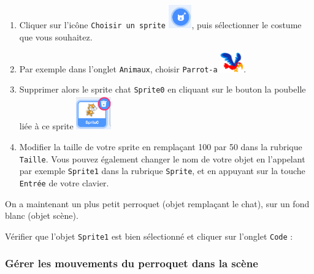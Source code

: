 \begin{enumerate}
\item Cliquer sur l'icône \texttt{Choisir un sprite} \includegraphics[width=1cm]{./images/scratch/sprite.png}, puis sélectionner le costume que vous souhaitez.
\item Par exemple dans l'onglet \texttt{Animaux}, choisir \texttt{Parrot-a} \includegraphics[width=1cm]{./images/scratch/parrot.png}.
\item Supprimer alors le sprite chat \texttt{Sprite0} en cliquant sur le bouton la poubelle liée à ce sprite \includegraphics[width=1.5cm]{./images/scratch/poubelleChat.png}
\item Modifier la taille de votre sprite en remplaçant 100 par 50 dans la rubrique \texttt{Taille}. Vous pouvez également changer le nom de votre objet en l'appelant par exemple \texttt{Sprite1} dans la rubrique \texttt{Sprite}, et en appuyant sur la touche \texttt{Entrée} de votre clavier.
\end{enumerate}
On a maintenant un plus petit perroquet (objet remplaçant le chat), sur un fond blanc (objet scène).

Vérifier que l'objet \texttt{Sprite1} est bien sélectionné et cliquer sur l'onglet \texttt{Code} :







\subsubsection{Gérer les mouvements du perroquet dans la scène}  


